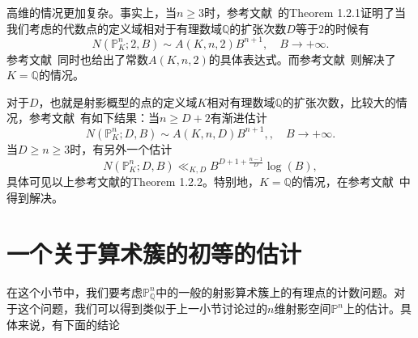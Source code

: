 
高维的情况更加复杂。事实上，当$n\geqslant3$时，参考文献~的Theorem 1.2.1证明了当我们考虑的代数点的定义域相对于有理数域$\mathbb{Q}$的扩张次数$D$等于$2$的时候有
\begin{equation}
N(\mathbb P^n_K;2,B)\sim A(K,n,2)B^{n+1}, \quad B \to +\infty.
\end{equation}
参考文献~同时也给出了常数$A(K,n,2)$的具体表达式。而参考文献~则解决了$K=\mathbb{Q}$的情况。

对于$D$，也就是射影概型的点的定义域$K$相对有理数域$\mathbb{Q}$的扩张次数，比较大的情况，参考文献~有如下结果：当$n \geqslant D+2$有渐进估计
\begin{equation}
N(\mathbb{P}^n_K;D,B) \sim A(K,n,D) B^{n+1}, , \quad B \to +\infty.
\end{equation}
当$D \geqslant n \geqslant3$时，有另外一个估计
\begin{equation}
N(\mathbb{P}^n_K;D,B) \ll_{K,D} B^{D+1+\frac{n-1}{D}} \log(B),
\end{equation}
具体可见以上参考文献的Theorem 1.2.2。特别地，$K=\mathbb{Q}$的情况，在参考文献~中得到解决。

\section{一个关于算术簇的初等的估计}
在这个小节中，我们要考虑$\mathbb{P}^n_{\mathbb{Q}}$中的一般的射影算术簇上的有理点的计数问题。对于这个问题，我们可以得到类似于上一小节讨论过的$n$维射影空间$\mathbb{P}^n$上的估计。具体来说，有下面的结论


